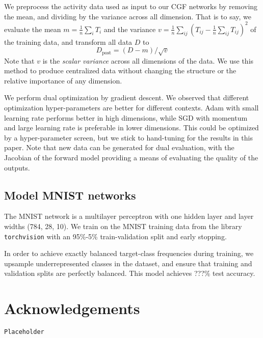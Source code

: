 \documentclass{article}      %
\begin{document}
We preprocess the activity data used as input to our CGF networks by removing the mean, and dividing by the variance across all dimension.
That is to say, we evaluate the mean $m = \frac{1}{n} \sum_i T_i$ and the variance ${v = \frac{1}{n}\sum_{ij} \left(T_{ij} - \frac{1}{n}\sum_{ij} T_{ij} \right)^2}$ of the training data, and transform all data $D$ to
\begin{equation}
  D_{\textrm{post}} = (D - m) /\sqrt{v}
\end{equation}
Note that $v$ is the \textit{scalar variance} across all dimensions of the data.
We use this method to produce centralized data without changing the structure or the relative importance of any dimension.

We perform dual optimization by gradient descent. We observed that different optimization hyper-parameters are better for different contexts.
Adam with small learning rate performs better in high dimensions, while SGD with momentum and large learning rate is preferable in lower dimensions.
This could be optimized by a hyper-parameter screen, but we stick to hand-tuning for the results in this paper.
Note that new data can be generated for dual evaluation, with the Jacobian of the forward model providing a means of evaluating the quality of the outputs.




\subsection{Model MNIST networks} \label{sec:model_network_details}

The MNIST network is a multilayer perceptron with one hidden layer and layer widths (784, 28, 10).
We train on the MNIST training data from the library \texttt{torchvision} with an 95\%-5\% train-validation split and early stopping.

In order to achieve exactly balanced target-class frequencies during training,  we upsample underrepresented classes in the dataset, and ensure that training and validation splits are perfectly balanced. 
This model achieves ???\% test accuracy.








\section*{Acknowledgements}

\texttt{Placeholder}
\end{document}
